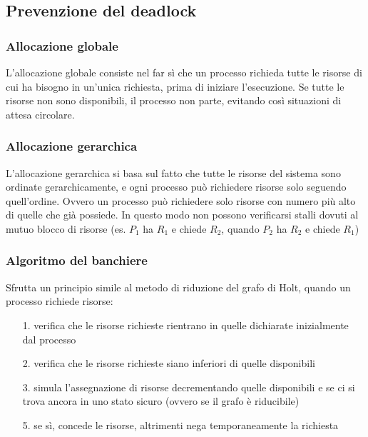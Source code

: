 \documentclass[a4paper]{article}
\begin{document}
\newpage


\subsection{Prevenzione del deadlock}
\subsubsection*{Allocazione globale}
L'allocazione globale consiste nel far sì che un processo richieda tutte le risorse di cui ha bisogno in un'unica richiesta,
prima di iniziare l'esecuzione. Se tutte le risorse non sono disponibili, il processo non parte, evitando così situazioni di
attesa circolare.

\subsubsection*{Allocazione gerarchica}
L'allocazione gerarchica si basa sul fatto che tutte le risorse del sistema sono ordinate gerarchicamente, e ogni processo può
richiedere risorse solo seguendo quell’ordine. Ovvero un processo può richiedere solo risorse con numero più alto di quelle che
già possiede. In questo modo non possono verificarsi stalli dovuti al mutuo blocco di risorse (es. \(P_1\) ha \(R_1\) e chiede
\(R_2\), quando \(P_2\) ha \(R_2\) e chiede \(R_1\))

\subsubsection*{Algoritmo del banchiere}
Sfrutta un principio simile al metodo di riduzione del grafo di Holt, quando un processo richiede risorse:
\begin{itemize}
	\item[1.] verifica che le risorse richieste rientrano in quelle dichiarate inizialmente dal processo
	\item[2.] verifica che le risorse richieste siano inferiori di quelle disponibili
	\item[3.] simula l'assegnazione di risorse decrementando quelle disponibili e se ci si trova ancora in uno stato sicuro
	(ovvero se il grafo è riducibile)
	\item[5.] se sì, concede le risorse, altrimenti nega temporaneamente la richiesta
\end{itemize}
\end{document}
